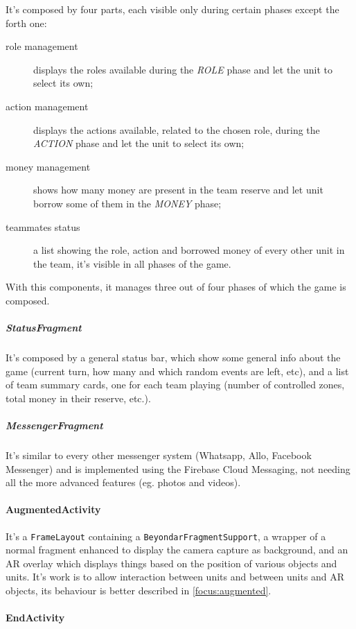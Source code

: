 			It's composed by four parts, each visible only during certain phases except the forth one:
			\begin{description}
				\item[role management] displays the roles available during the \emph{ROLE} phase and let the unit to select its own;
				\item[action management] displays the actions available, related to the chosen role, during the \emph{ACTION} phase and let the unit to select its own;
				\item[money management] shows how many money are present in the team reserve and let unit borrow some of them in the \emph{MONEY} phase;
				\item[teammates status] a list showing the role, action and borrowed money of every other unit in the team, it's visible in all phases of the game.
			\end{description}
			
			With this components, it manages three out of four phases of which the game is composed.
			
			\subparagraph{StatusFragment}
			
			It's composed by a general status bar, which show some general info about the game (current turn, how many and which random events are left, etc), and a list of team summary cards, one for each team playing (number of controlled zones, total money in their reserve, etc.).
			
			\subparagraph{MessengerFragment}
			
			It's similar to every other messenger system (Whatsapp, Allo, Facebook Messenger) and is implemented using the Firebase Cloud Messaging, not needing all the more advanced features (eg. photos and videos).
		
		\paragraph{AugmentedActivity}
		
		It's a \lstinline|FrameLayout| containing a \lstinline|BeyondarFragmentSupport|, a wrapper of a normal fragment enhanced to display the camera capture as background, and an AR overlay which displays things based on the position of various objects and units.
		It's work is to allow interaction between units and between units and AR objects, its behaviour is better described in \autoref{focus:augmented}.
		
		\paragraph{EndActivity}
	
